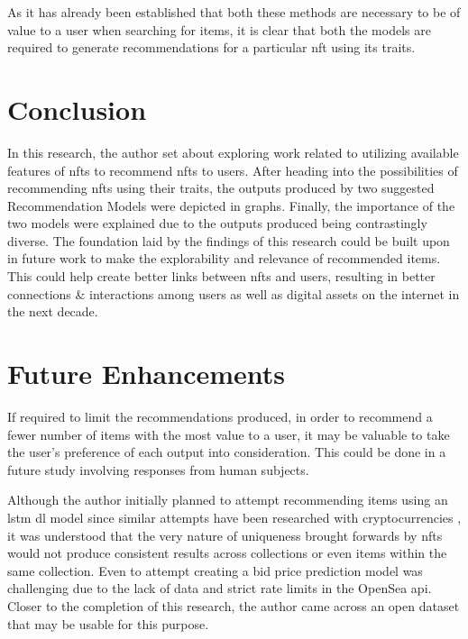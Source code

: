 \documentclass[conference]{IEEEtran}
\begin{document}
As it has already been established that both these methods are necessary to be of value to a user when searching for items, it is clear that both the models are required to generate recommendations for a particular \gls{nft} using its traits.




\section{Conclusion}
In this research, the author set about exploring work related to utilizing available features of \gls{nft}s to recommend \gls{nft}s to users. After heading into the possibilities of recommending \gls{nft}s using their traits, the outputs produced by two suggested Recommendation Models were depicted in graphs. Finally, the importance of the two models were explained due to the outputs produced being contrastingly diverse. The foundation laid by the findings of this research could be built upon in future work to make the explorability and relevance of recommended items. This could help create better links between \gls{nft}s and users, resulting in better connections \& interactions among users as well as digital assets on the internet in the next decade.


\section{Future Enhancements}

If required to limit the recommendations produced, in order to recommend a fewer number of items with the most value to a user, it may be valuable to take the user's preference of each output into consideration. This could be done in a future study involving responses from human subjects.

Although the author initially planned to attempt recommending items using an \gls{lstm} \gls{dl} model since similar attempts have been researched with cryptocurrencies \autocite{ferdiansyah_lstm-method_2019}, it was understood that the very nature of uniqueness brought forwards by \gls{nft}s would not produce consistent results across collections or even items within the same collection. Even to attempt creating a bid price prediction model was challenging due to the lack of data and strict rate limits in the OpenSea \gls{api}. Closer to the completion of this research, the author came across an open dataset \autocite{zomglings_ethereum_2021} that may be usable for this purpose.
\end{document}
